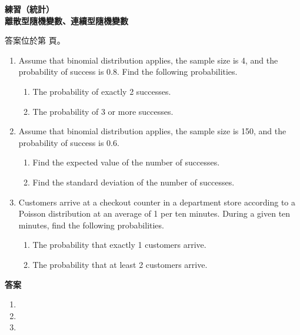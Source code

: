\documentclass[10pt]{article}
\renewcommand*{\maketitle}{{%
  \bfseries
  \LARGE 練習（統計） \\
  \large 離散型隨機變數、連續型隨機變數 \par
}}
\begin{document}
\maketitle
\medskip
答案位於第 \pageref{answer} 頁。
\begin{enumerate}[label=\arabic*.,align=left,leftmargin=*,labelsep=.5em]
  \item Assume that binomial distribution applies, the sample size is 4, and the probability of success is 0.8.
  Find the following probabilities.
  \begin{enumerate}[label=(\alph*),left=0pt,widest=a,topsep=0ex]
    \item The probability of exactly 2 successes.
    \item The probability of 3 or more successes.
  \end{enumerate}
  \newpage
  \item Assume that binomial distribution applies, the sample size is 150, and the probability of success is 0.6.
  \begin{enumerate}[label=(\alph*),left=0pt,widest=a,topsep=0ex]
    \item Find the expected value of the number of successes.
    \item Find the standard deviation of the number of successes.
  \end{enumerate}
  \newpage
  \item Customers arrive at a checkout counter in a department store according to a Poisson distribution
  at an average of 1 per ten minutes.
  During a given ten minutes, find the following probabilities.
  \begin{enumerate}[label=(\alph*),left=0pt,widest=a,topsep=0ex]
    \item The probability that exactly 1 customers arrive.
    \item The probability that at least 2 customers arrive.
  \end{enumerate}
\end{enumerate}

\newpage
\label{answer}
{\bfseries\large 答案 \par}
\begin{enumerate}[label=\arabic*.,align=left,leftmargin=*,labelsep=.3em]
  \item
  \item
  \item
\end{enumerate}
\end{document}
